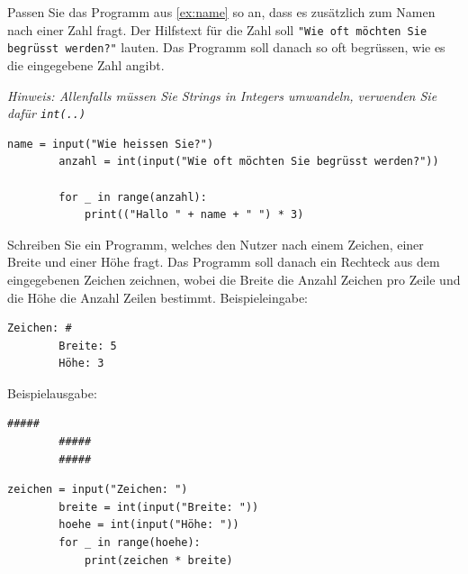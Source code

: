 \begin{myexercise}\label{ex:name2}
	Passen Sie das Programm aus \cref{ex:name} so an, dass es zusätzlich zum Namen nach einer Zahl fragt. Der Hilfstext für die Zahl soll \lstinline|"Wie oft möchten Sie begrüsst werden?"| lauten. Das Programm soll danach so oft begrüssen, wie es die eingegebene Zahl angibt.

	\textit{Hinweis: Allenfalls müssen Sie Strings in Integers umwandeln, verwenden Sie dafür \texttt{int(..)}}
	\begin{myanswer}
		\begin{lstlisting}[numbers=none]
		name = input("Wie heissen Sie?")
		anzahl = int(input("Wie oft möchten Sie begrüsst werden?"))
		
		for _ in range(anzahl):
			print(("Hallo " + name + " ") * 3)
	  \end{lstlisting}
	\end{myanswer}
\end{myexercise}

\begin{myexercise}\label{ex:textquadrat}
	Schreiben Sie ein Programm, welches den Nutzer nach einem Zeichen, einer Breite und einer Höhe fragt. Das Programm soll danach ein Rechteck aus dem eingegebenen Zeichen zeichnen, wobei die Breite die Anzahl Zeichen pro Zeile und die Höhe die Anzahl Zeilen bestimmt. Beispieleingabe:

	\begin{lstlisting}[numbers=none]
		Zeichen: #
		Breite: 5
		Höhe: 3
	  \end{lstlisting}
	Beispielausgabe:

	\begin{lstlisting}[numbers=none]
		#####
		#####
		#####
	  \end{lstlisting}
	\begin{myanswer}
		\begin{lstlisting}[numbers=none]
		zeichen = input("Zeichen: ")
		breite = int(input("Breite: "))
		hoehe = int(input("Höhe: "))
		for _ in range(hoehe):
			print(zeichen * breite)
	  \end{lstlisting}
	\end{myanswer}
\end{myexercise}


